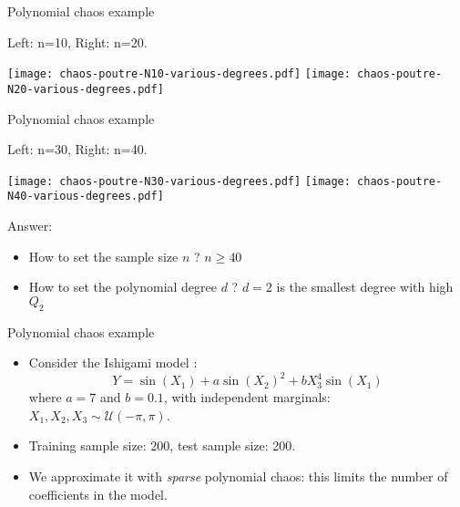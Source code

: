 \documentclass{beamer}
\begin{document}
\begin{frame}[t]{Polynomial chaos example}

Left: n=10, Right: n=20.

\begin{center}
\texttt{[image: chaos-poutre-N10-various-degrees.pdf]}
\texttt{[image: chaos-poutre-N20-various-degrees.pdf]}
\end{center}

\end{frame}


\begin{frame}[t]{Polynomial chaos example}

Left: n=30, Right: n=40.

\begin{center}
\texttt{[image: chaos-poutre-N30-various-degrees.pdf]}
\texttt{[image: chaos-poutre-N40-various-degrees.pdf]}
\end{center}

Answer:
\begin{itemize}
\item How to set the sample size $n$ ? $n\geq 40$
\item How to set the polynomial degree $d$ ? $d=2$ is the smallest 
degree with high $Q_2$
\end{itemize}


\end{frame}

\begin{frame}[t]{Polynomial chaos example}

\begin{example}
\begin{itemize}
\item Consider the Ishigami model \cite{ishigami1990importance}: 
$$
Y  = \sin(X_1) + a \sin(X_2)^2 + b X_3^4 \sin(X_1)
$$
where $a=7$ and $b=0.1$, with independent marginals: $X_1,X_2,X_3 \sim \mathcal{U}(-\pi, \pi)$.

\item Training sample size: 200, test sample size: 200.
\item We approximate it with \emph{sparse} polynomial chaos: this limits 
the number of coefficients in the model.
\end{itemize}
\end{example}
\end{frame}
\end{document}
